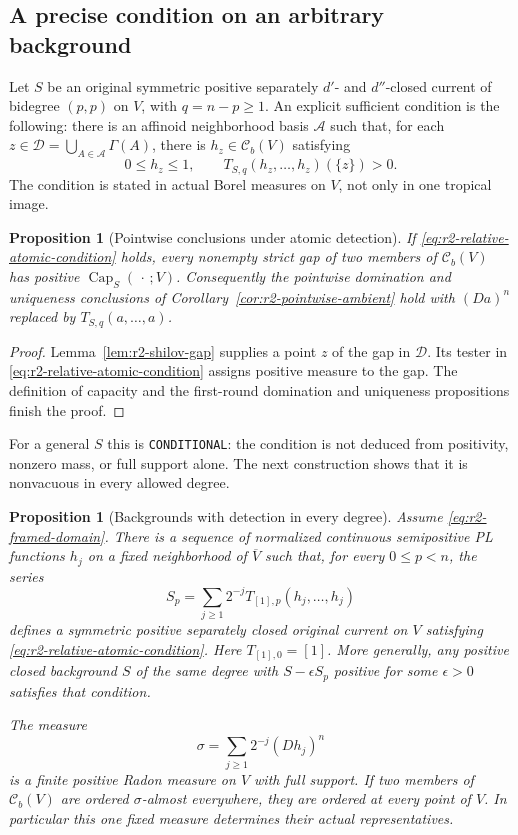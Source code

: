 \documentclass[11pt,a4paper]{article}
\numberwithin{equation}{section}
\newtheorem{proposition}[theorem]{Proposition}
\theoremstyle{definition}
\theoremstyle{remark}
\newcommand{\Cb}{\mathcal C_b}
\begin{document}
\subsection{A precise condition on an arbitrary background}

Let $S$ be an original symmetric positive separately $d'$- and
$d''$-closed current of bidegree $(p,p)$ on $V$, with
$q=n-p\geq1$. An explicit sufficient condition is the following:
there is an affinoid neighborhood basis $\mathscr A$ such that, for
each $z\in\mathscr D=\bigcup_{A\in\mathscr A}\Gamma(A)$, there is
$h_z\in\Cb(V)$ satisfying
\[
 0\leq h_z\leq1,
 \qquad T_{S,q}(h_z,\ldots,h_z)(\{z\})>0.
 \tag{A}\label{eq:r2-relative-atomic-condition}
\]
The condition is stated in actual Borel measures on $V$, not only in
one tropical image.

\begin{proposition}[Pointwise conclusions under atomic detection]
\label{prop:r2-relative-gap-detection}
If \eqref{eq:r2-relative-atomic-condition} holds, every nonempty
strict gap of two members of $\Cb(V)$ has positive
$\operatorname{Cap}_S(\,\cdot\,;V)$. Consequently the pointwise
domination and uniqueness conclusions of
Corollary~\ref{cor:r2-pointwise-ambient} hold with
$(Da)^n$ replaced by $T_{S,q}(a,\ldots,a)$.
\end{proposition}

\begin{proof}
Lemma~\ref{lem:r2-shilov-gap} supplies a point $z$ of the gap in
$\mathscr D$. Its tester in \eqref{eq:r2-relative-atomic-condition}
assigns positive measure to the gap. The definition of capacity and
the first-round domination and uniqueness propositions finish the
proof.
\end{proof}

For a general $S$ this is \texttt{CONDITIONAL}: the condition is not
deduced from positivity, nonzero mass, or full support alone. The
next construction shows that it is nonvacuous in every allowed degree.

\begin{proposition}[Backgrounds with detection in every degree]
\label{prop:r2-faithful-backgrounds}
Assume \eqref{eq:r2-framed-domain}. There is a sequence of normalized
continuous semipositive PL functions $h_j$ on a fixed neighborhood
of $\overline V$ such that, for every $0\leq p<n$, the series
\[
 S_p=\sum_{j\geq1}2^{-j}T_{[1],p}(h_j,\ldots,h_j)
\]
defines a symmetric positive separately closed original current on
$V$ satisfying \eqref{eq:r2-relative-atomic-condition}. Here
$T_{[1],0}=[1]$. More generally, any positive closed background $S$
of the same degree with $S-\epsilon S_p$ positive for some
$\epsilon>0$ satisfies that condition.

The measure
\[
 \sigma=\sum_{j\geq1}2^{-j}(Dh_j)^n
\]
is a finite positive Radon measure on $V$ with full support. If two
members of $\Cb(V)$ are ordered $\sigma$-almost everywhere, they
are ordered at every point of $V$. In particular this one fixed
measure determines their actual representatives.
\end{proposition}
\end{document}
